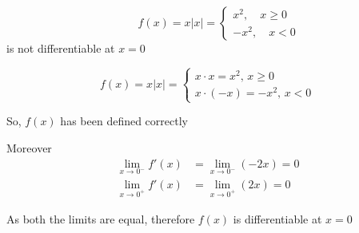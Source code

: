 \documentclass[14pt,fleqn]{extarticle}
\begin{document}
 
\begin{snippet}
    
    \incorrect
    \[ \qquad f(x) = x\vert x\vert = \begin{cases}
    x^2,\quad x \geq 0 \\
    -x^2,\quad x < 0 
    \end{cases} \]
    is not differentiable at $x=0$ 
    
    \reason
    
    \[ f(x) = x\vert x\vert = \begin{cases}
    x\cdot x = x^2, \, x \geq 0 \\
    x\cdot \left(-x \right) = -x^2,\,x < 0
    \end{cases}  \]
    
    So, $f(x)$ has been defined correctly\newline 
    
    Moreover
    \begin{align}
	\lim_{x\to 0^-} f'(x) &= \lim_{x\to 0^-} \left(-2x \right) = 0 \\
	\lim_{x\to 0^+} f'(x) &= \lim_{x\to 0^+} \left(2x \right) = 0
\end{align}

As both the limits are equal, therefore $f(x)$ is differentiable at $x=0$ 
    
\end{snippet} 
\end{document}
